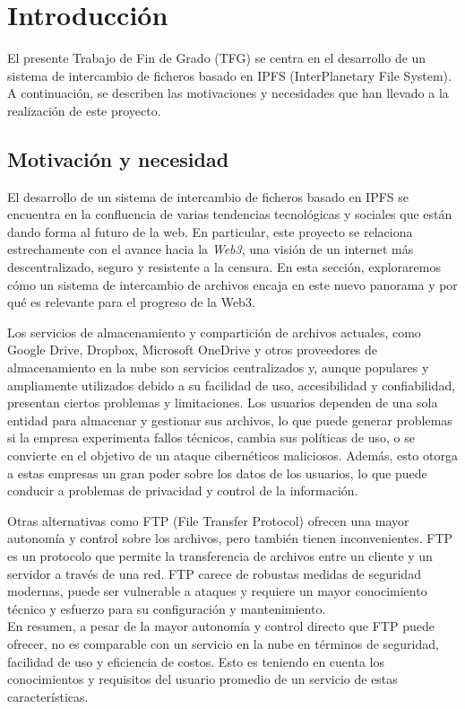 \chapter{Introducción}\label{chap:1introduccion}
El presente Trabajo de Fin de Grado (TFG) se centra en el desarrollo de un sistema de intercambio de ficheros basado en
IPFS (InterPlanetary File System)\cite{IPFSPowersDistributed}.
\\A continuación, se describen las motivaciones y necesidades que han llevado a la realización de este proyecto.
\section{Motivación y necesidad}

El desarrollo de un sistema de intercambio de ficheros basado en IPFS se encuentra en la confluencia de varias tendencias
tecnológicas y sociales que están dando forma al futuro de la web. En particular, este proyecto se relaciona estrechamente
con el avance hacia la \textit{Web3}\cite{Web32023}, una visión de un internet más descentralizado, seguro y resistente a la censura.
En esta sección, exploraremos cómo un sistema de intercambio de archivos encaja en este nuevo panorama y por qué es relevante para el progreso de la Web3.

Los servicios de almacenamiento y compartición de archivos actuales, como Google Drive, Dropbox, Microsoft OneDrive y otros
proveedores de almacenamiento en la nube son servicios centralizados y, aunque populares y ampliamente utilizados debido
a su facilidad de uso, accesibilidad y confiabilidad, presentan ciertos problemas y limitaciones. Los usuarios dependen de una
sola entidad para almacenar y gestionar sus archivos, lo que puede generar problemas si la empresa experimenta fallos técnicos,
cambia sus políticas de uso, o se convierte en el objetivo de un ataque cibernéticos maliciosos.
Además, esto otorga a estas empresas un gran poder sobre los datos de los usuarios, lo que puede conducir a problemas de privacidad y control de la información.

Otras alternativas como FTP (File Transfer Protocol) ofrecen una mayor autonomía y control sobre los archivos, pero también
tienen inconvenientes. FTP es un protocolo que permite la transferencia de archivos
entre un cliente y un servidor a través de una red. FTP carece de robustas medidas de seguridad modernas, puede ser vulnerable
a ataques y requiere un mayor conocimiento técnico y esfuerzo para su configuración y mantenimiento.
\\En resumen, a pesar de la mayor autonomía y control directo que FTP
puede ofrecer, no es comparable con un servicio en la nube en términos de seguridad, facilidad de uso y eficiencia de costos.
Esto es teniendo en cuenta los conocimientos y requisitos del usuario promedio de un servicio de estas características.


